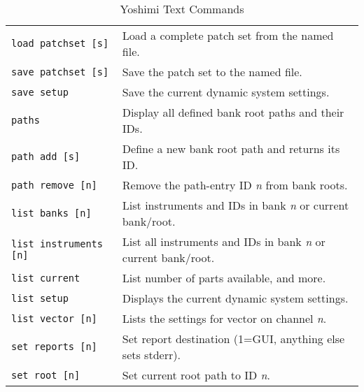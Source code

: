    \begin{table}[H]
      \centering
      \caption{Yoshimi Text Commands}
      \label{table:yoshimi_text_commands}
      \begin{tabular}{l l}

         \texttt{load patchset [s]} &
            Load a complete patch set from the named file. \\

         \texttt{save patchset [s]} &
            Save the patch set to the named file. \\

         \texttt{save setup} &
            Save the current dynamic system settings. \\

         \texttt{paths} &
            Display all defined bank root paths and their IDs. \\

         \texttt{path add [s]} &
            Define a new bank root path and returns its ID. \\

         \texttt{path remove [n]} &
            Remove the path-entry ID \textsl{n} from bank roots. \\

         \texttt{list banks [n]} &
            List instruments and IDs in bank \textsl{n} or
            current bank/root. \\

         \texttt{list instruments [n]} &
            List all instruments and IDs in bank \textsl{n}
            or current bank/root. \\

         \texttt{list current} &
            List number of parts available, and more. \\

         \texttt{list setup} &
            Displays the current dynamic system settings. \\

         \texttt{list vector [n]} &
            Lists the settings for vector on channel \textsl{n}. \\

         \texttt{set reports [n]} &
            Set report destination (1=GUI, anything else sets stderr). \\

         \texttt{set root [n]} &
            Set current root path to ID \textsl{n}. \\


\end{tabular}
\end{table}
